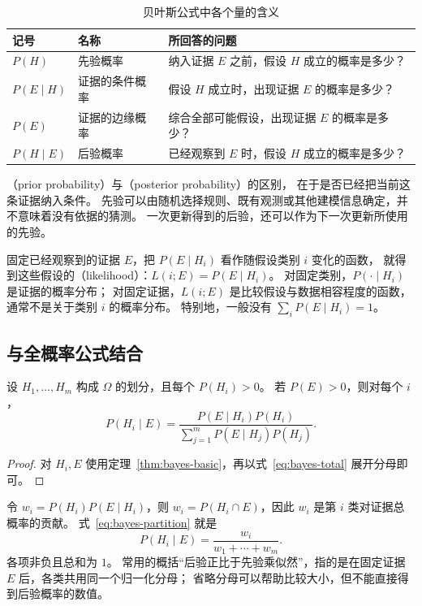 \documentclass[UTF8]{ctexart}
\begin{document}
\begin{table}[htbp]
  \centering
  \caption{贝叶斯公式中各个量的含义}
  \label{tab:bayes-terms}
  \begin{tabularx}{\textwidth}{l l Y}
    \toprule
    记号 & 名称 & 所回答的问题 \\
    \midrule
    $P(H)$ & 先验概率 & 纳入证据 $E$ 之前，假设 $H$ 成立的概率是多少？ \\
    $P(E\mid H)$ & 证据的条件概率 & 假设 $H$ 成立时，出现证据 $E$ 的概率是多少？ \\
    $P(E)$ & 证据的边缘概率 & 综合全部可能假设，出现证据 $E$ 的概率是多少？ \\
    $P(H\mid E)$ & 后验概率 & 已经观察到 $E$ 时，假设 $H$ 成立的概率是多少？ \\
    \bottomrule
  \end{tabularx}
\end{table}

（prior probability）与（posterior probability）的区别，
在于是否已经把当前这条证据纳入条件。
先验可以由随机选择规则、既有观测或其他建模信息确定，并不意味着没有依据的猜测。
一次更新得到的后验，还可以作为下一次更新所使用的先验。

固定已经观察到的证据 $E$，把 $P(E\mid H_i)$ 看作随假设类别 $i$ 变化的函数，
就得到这些假设的（likelihood）：$L(i;E)=P(E\mid H_i)$。
对固定类别，$P(\cdot\mid H_i)$ 是证据的概率分布；
对固定证据，$L(i;E)$ 是比较假设与数据相容程度的函数，通常不是关于类别 $i$ 的概率分布。
特别地，一般没有 $\sum_iP(E\mid H_i)=1$。

\subsection{与全概率公式结合}

\begin{theorem}[有限划分下的贝叶斯公式]
\label{thm:bayes-partition}
设 $H_1,\ldots,H_m$ 构成 $\Omega$ 的划分，且每个 $P(H_i)>0$。
若 $P(E)>0$，则对每个 $i$，
\begin{equation}
  P(H_i\mid E)
  =\frac{P(E\mid H_i)P(H_i)}
  {\displaystyle\sum_{j=1}^{m}P(E\mid H_j)P(H_j)}.
  \label{eq:bayes-partition}
\end{equation}
\end{theorem}
\begin{proof}
对 $H_i,E$ 使用定理~\ref{thm:bayes-basic}，再以式~\eqref{eq:bayes-total} 展开分母即可。
\end{proof}

令 $w_i=P(H_i)P(E\mid H_i)$，则 $w_i=P(H_i\cap E)$，因此 $w_i$ 是第 $i$ 类对证据总概率的贡献。
式~\eqref{eq:bayes-partition} 就是
\[
  P(H_i\mid E)=\frac{w_i}{w_1+\cdots+w_m}.
\]
各项非负且总和为 $1$。
常用的概括“后验正比于先验乘似然”，指的是在固定证据 $E$ 后，各类共用同一个归一化分母；
省略分母可以帮助比较大小，但不能直接得到后验概率的数值。
\end{document}
